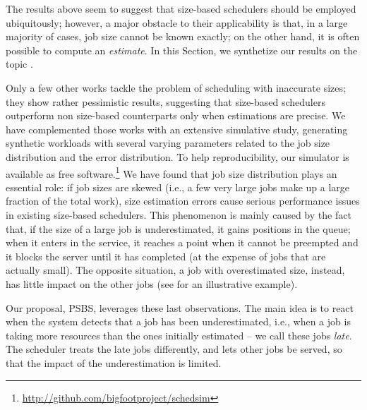 \documentclass[11pt,oneside,english]{amsart}
\numberwithin{equation}{section}
\numberwithin{figure}{section}
\theoremstyle{definition}
\theoremstyle{plain}
\begin{document}
The results above seem to suggest that size-based schedulers should
be employed ubiquitously; however, a major obstacle to their applicability
is that, in a large majority of cases, job size cannot be known exactly;
on the other hand, it is often possible to compute an \emph{estimate}. 
In this Section, we synthetize our results
on the topic \cite{dell2014revisiting,DellAmico2014}.\begin{comment}
 For example, a file server can base its estimation on file size \cite{schroeder2006web},
and a data processing job can use the size of its input. In several
cases, literature several ways of predicting job sizes that depend
on domain knowledge \cite{nsdi12-c,lipton1995query,query_perf,mascots12}.
\end{comment}


Only a few other works \cite{lu2004size,wierman2008scheduling} tackle
the problem of scheduling with inaccurate sizes; they show rather pessimistic
results, suggesting that size-based schedulers outperform non
size-based counterparts only when estimations are precise. We have
complemented those works with an extensive simulative study, generating
synthetic workloads with several varying parameters related to the job
size distribution and the error distribution. To help reproducibility,
our simulator is available as free software.\footnote{\url{http://github.com/bigfootproject/schedsim}}
We have found that job size distribution plays an essential role:
if job sizes are skewed (i.e., a few very large jobs make up a large
fraction of the total work), size estimation errors cause serious
performance issues in existing size-based schedulers. This phenomenon
is mainly caused by the fact that, if the size of a large job is 
underestimated, it gains positions in the queue; when it enters in 
the service, it reaches a point when it cannot be preempted and it blocks the server
until it has completed (at the expense of jobs that are actually small).
The opposite situation, a job with overestimated size, instead, has little
impact on the other jobs (see \cite{DellAmico2014} for an illustrative example).

Our proposal, PSBS, leverages these last observations. The main idea is
to react when the system detects that a job has been underestimated, 
i.e., when a job is taking more resources than the ones initially estimated --
we call these jobs \emph{late}. The scheduler treats the late jobs differently, 
and lets other jobs be served, so that the impact of the underestimation 
is limited.
\end{document}
